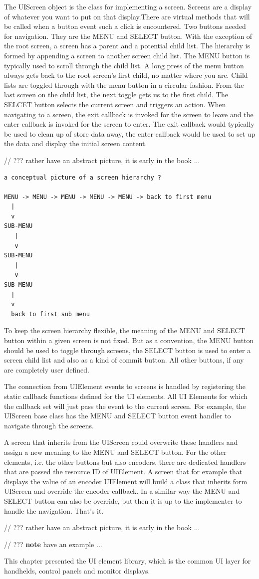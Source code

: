 The UIScreen object is the class for implementing a screen. Screens are a display of whatever you want to put on that display.There are virtual methods that will be called when a button event such a click is encountered. Two buttons needed for navigation. They are the MENU and SELECT button. With the exception of the root screen, a screen has a parent and a potential child list. The hierarchy is formed by appending a screen to another screen child list. The MENU button is typically used to scroll through the child list. A long press of the menu button always gets back to the root screen's first child, no matter where you are. Child lists are toggled through with the menu button in a circular fashion. From the last screen on the child list, the next toggle gets us to the first child. The SELCET button selects the current screen and triggers an action. When navigating to a screen, the exit callback is invoked for the screen to leave and the enter callback is invoked for the screen to enter. The exit callback would typically be used to clean up of store data away, the enter callback would be used to set up the data and display the initial screen content.

// ??? rather have an abstract picture, it is early in the book ...


\lstset{language=c++, style=codesnippetstyle}
\begin{lstlisting}
a conceptual picture of a screen hierarchy ?

MENU -> MENU -> MENU -> MENU -> MENU -> back to first menu
  |
  v
SUB-MENU
   |
   v
SUB-MENU
   |
   v
SUB-MENU
  |
  v
  back to first sub menu
\end{lstlisting}
\FloatBarrier

To keep the screen hierarchy flexible, the meaning of the MENU and SELECT button within a given screen is not fixed. But as a convention, the MENU button should be used to toggle through screens, the SELECT button is used to enter a screen child list and also as a kind of commit button. All other buttons, if any are completely user defined.

The connection from UIElement events to screens is handled by registering the static callback functions defined for the UI elements. All UI Elements for which the callback set will just pass the event to the current screen. For example, the UIScreen base class has the MENU and SELECT button event handler to navigate through the screens.

A screen that inherits from the UIScreen could overwrite these handlers and assign a new meaning to the MENU and SELECT button. For the other elements, i.e. the other buttons but also encoders, there are dedicated handlers that are passed the resource ID of UIElement. A screen that for example that displays the value of an encoder UIElement will build a class that inherits form UIScreen and override the encoder callback. In a similar way the MENU and SELECT button can also be override, but then it is up to the implementer to handle the navigation. That's it.

// ??? rather have an abstract picture, it is early in the book ...

// ??? \textbf{note} have an example ...


This chapter presented the UI element library, which is the common UI layer for handhelds, control panels and monitor displays.
